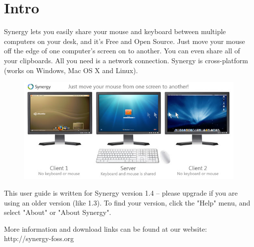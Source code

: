 \section{Intro}

Synergy lets you easily share your mouse and keyboard between multiple
computers on your desk, and it's Free and Open Source. Just move your
mouse off the edge of one computer's screen on to another. You can even
share all of your clipboards. All you need is a network connection. Synergy
is cross-platform (works on Windows, Mac OS X and Linux).

\begin{figure}[H]
\includegraphics[scale=.65]{graphics/intro.jpg}
\end{figure}

This user guide is written for Synergy version 1.4 -- please upgrade if
you are using an older version (like 1.3). To find your version, click
the "Help" menu, and select "About" or "About Synergy".

More information and download links can be found at our website:
http://synergy-foss.org